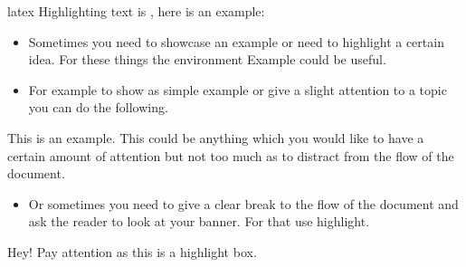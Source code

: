 \documentclass[minted, draw]{../tex/hebdomon}
\begin{document}
\begin{code}{latex}
Highlighting text is , here is an example:
\end{code}

\begin{itemize}[leftmargin=!,labelindent=-29.2pt]
	\item[\pcode{example}] Sometimes you need to showcase an example or
	      need to highlight a certain idea.
	      For these things the environment Example could be useful.
	\item[] For example to show as simple example or give a slight attention to a topic you can do the following.
\end{itemize}

\begin{example}
	This is an example. This could be anything which you would like to have a certain amount of
	attention but not too much as to distract from the flow of the document.
\end{example}

\begin{itemize}[leftmargin=!,labelindent=-29.2pt]
	\item[\pcode{highlight}] Or sometimes you need to give a clear break to the flow of the
	      document and ask the reader to look at your banner. For that use highlight.
\end{itemize}

\begin{highlight}
	Hey! Pay attention as this is a highlight box.
\end{highlight}
\end{document}
